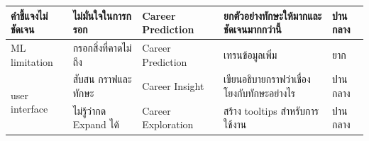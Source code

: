 \begin{enumerate}
\begin{table}[H]
\begin{tabularx}{\textwidth}{|l|X|l|X|X|}
                  คำชี้แจงไม่ชัดเจน                     & ไม่มั่นใจในการกรอก                    & Career Prediction  & ยกตัวอย่างทักษะให้มากและชัดเจนมากกว่านี้                  & ปานกลาง                  \\ \hline
                  ML limitation                       & กรอกสิ่งที่คาดไม่ถึง                     & Career Prediction  & เทรนข้อมูลเพิ่ม                                       & ยาก               \\ \hline
                  \multirow[t]{2}{*}{user interface}  & สับสน กราฟและทักษะ                   & Career Insight     & เขียนอธิบายกราฟว่าเชื่องโยงกับทักษะอย่างไร                & ปานกลาง                  \\ \cline{2-5}
                                                      & ไม่รู้ว่ากด Expand ได้                  & Career Exploration & สร้าง tooltips สำหรับการใช้งาน                        & ปานกลาง                  \\ \hline
              \end{tabularx}
          \end{table}
\end{enumerate}
